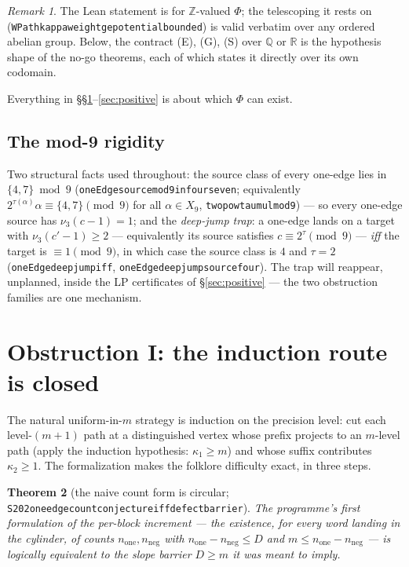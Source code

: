 \documentclass[11pt]{amsart}
\newtheorem{theorem}{Theorem}[section]
\theoremstyle{definition}
\theoremstyle{remark}
\newtheorem{remark}[theorem]{Remark}
\newcommand{\lean}[1]{{\def\_{\textunderscore\allowbreak}\texttt{#1}}}
\newcommand{\Z}{\mathbb{Z}}
\newcommand{\Q}{\mathbb{Q}}
\newcommand{\R}{\mathbb{R}}
\newcommand{\nuthree}{\nu_3}
\begin{document}
\begin{remark}
The Lean statement is for $\Z$-valued $\Phi$; the telescoping it rests on
(\lean{WPath\_kappa\_weight\_ge\_potential\_bounded}) is valid verbatim over
any ordered abelian group.  Below, the contract (E), (G), (S) over $\Q$ or
$\R$ is the hypothesis shape of the no-go theorems, each of which states it
directly over its own codomain.
\end{remark}

Everything in \S\S\ref{sec:circular}--\ref{sec:positive} is about which
$\Phi$ can exist.

\subsection{The mod-9 rigidity}
Two structural facts used throughout: the source class of every one-edge lies
in $\{4,7\} \bmod 9$ (\lean{oneEdge\_source\_mod9\_in\_four\_seven};
equivalently $2^{\tau(\alpha)}\alpha \equiv \{4,7\} \pmod 9$ for all
$\alpha \in X_9$, \lean{two\_pow\_tau\_mul\_mod9}) --- so every one-edge
source has $\nuthree(c-1) = 1$; and the \emph{deep-jump trap}: a one-edge
lands on a target with $\nuthree(c'-1) \ge 2$ --- equivalently its source
satisfies $c \equiv 2^{\tau} \pmod 9$ --- \emph{iff} the target is
$\equiv 1 \pmod 9$, in which case the source class is $4$ and $\tau = 2$
(\lean{oneEdge\_deepjump\_iff}, \lean{oneEdge\_deepjump\_source\_four}).
The trap will reappear, unplanned, inside the LP certificates of
\S\ref{sec:positive} --- the two obstruction families are one mechanism.

\section{Obstruction I: the induction route is closed}\label{sec:circular}

The natural uniform-in-$m$ strategy is induction on the precision level: cut
each level-$(m{+}1)$ path at a distinguished vertex whose prefix projects to
an $m$-level path (apply the induction hypothesis: $\kappa_1 \ge m$) and
whose suffix contributes $\kappa_2 \ge 1$.  The formalization makes the
folklore difficulty exact, in three steps.

\begin{theorem}[the naive count form is circular;
\lean{S202\_one\_edge\_count\_conjecture\_iff\_defect\_barrier}]
\label{thm:circular}
The programme's first formulation of the per-block increment --- the
existence, for every word landing in the cylinder, of counts
$n_{\mathrm{one}}, n_{\mathrm{neg}}$ with
$n_{\mathrm{one}} - n_{\mathrm{neg}} \le D$ and
$m \le n_{\mathrm{one}} - n_{\mathrm{neg}}$ --- is logically equivalent to
the slope barrier $D \ge m$ it was meant to imply.
\end{theorem}
\end{document}
